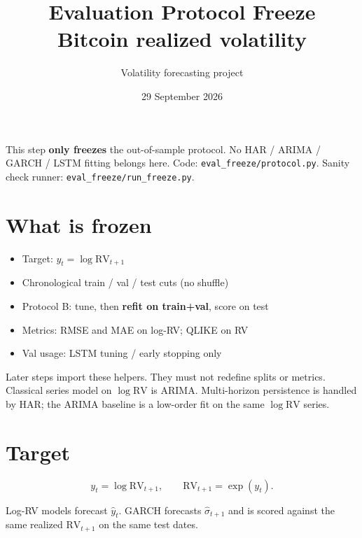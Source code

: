 \documentclass[12pt]{article}
\title{Evaluation Protocol Freeze\\[0.2em]
\large Bitcoin realized volatility}
\author{Volatility forecasting project}
\date{29 September 2026}
\begin{document}
\maketitle

\noindent
This step \textbf{only freezes} the out-of-sample protocol.
No HAR / ARIMA / GARCH / LSTM fitting belongs here.
Code: \texttt{eval\_freeze/protocol.py}. Sanity check runner: \texttt{eval\_freeze/run\_freeze.py}.

\section{What is frozen}
\begin{itemize}
  \item Target: \(y_t=\log\mathrm{RV}_{t+1}\)
  \item Chronological train / val / test cuts (no shuffle)
  \item Protocol B: tune, then \textbf{refit on train+val}, score on test
  \item Metrics: RMSE and MAE on log-RV; QLIKE on RV
  \item Val usage: LSTM tuning / early stopping only
\end{itemize}
\begin{explain}
Later steps import these helpers. They must not redefine splits or metrics.
Classical series model on \(\log\mathrm{RV}\) is ARIMA. Multi-horizon persistence is handled by HAR; the ARIMA baseline is a low-order fit on the same \(\log\mathrm{RV}\) series.
\end{explain}

\section{Target}
\[
y_t=\log\mathrm{RV}_{t+1},
\qquad
\mathrm{RV}_{t+1}=\exp(y_t).
\]
\begin{explain}
Log-RV models forecast \(\hat y_t\). GARCH forecasts \(\hat\sigma_{t+1}\) and is scored against the same realized \(\mathrm{RV}_{t+1}\) on the same test dates.
\end{explain}
\end{document}
